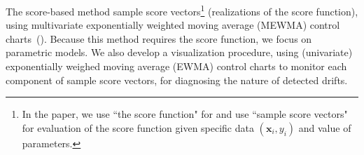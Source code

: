 \documentclass[twoside,11pt]{article}
\begin{document}


 The score-based method  sample score vectors\footnote{In the paper, we use ``the score function" for  and use ``sample score vectors" for evaluation of the score function given specific data $(\bm {x}_i,y_i)$ and value of parameters.} (realizations of the score function), using multivariate exponentially weighted moving average (MEWMA) control charts~(\cite{montgomery2007introduction}). Because this method requires the score function, we focus on parametric models. {We also develop a visualization procedure, using (univariate) exponentially weighed moving average (EWMA) control charts to monitor each component of sample score vectors, for diagnosing the nature of detected drifts.} 
\end{document}
